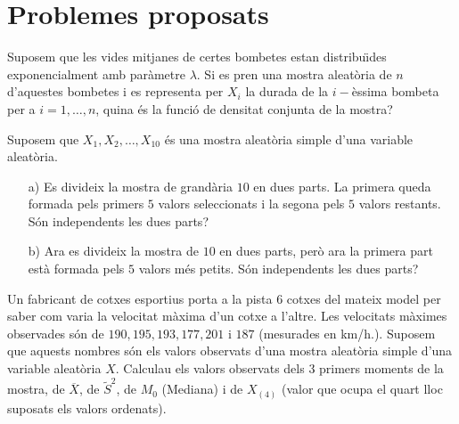 
\section{Problemes proposats}

\begin{prob}
{Suposem que les vides mitjanes de certes bombetes estan
distribu\"{\i}des exponencialment amb par\`ametre 
$\lambda$. Si es pren una mostra aleat\`oria 
de $n$ d'aquestes bombetes i es representa per $X_i$ la durada de
la $i-$\`essima bombeta per a $i=1,\ldots,n$, quina \'es la funci\'o 
de densitat conjunta de la mostra?}
\end{prob}

\begin{prob}
{Suposem que $X_1,X_2,\ldots,X_{10}$ \'es una mostra aleat\`oria simple
d'una variable aleat\`oria. 
\begin{itemize}
\item[a)] {Es divideix la mostra de grand\`aria $10$ en dues parts. 
La primera queda formada pels primers $5$ valors seleccionats i la segona 
pels $5$ valors restants. S\'on independents 
les dues parts?}
\item[b)] {Ara es divideix la mostra de $10$ en dues parts, 
per\`o ara la primera part est\`a formada pels $5$ valors m\'es petits. 
S\'on independents les dues parts?}
\end{itemize}}
\end{prob}

\begin{prob}
{Un fabricant de cotxes esportius porta a la pista $6$ 
cotxes del mateix model per saber com varia la velocitat 
m\`axima d'un cotxe a l'altre. Les velocitats 
m\`aximes observades s\'on de $190,195,193,177,201$ i $187$
(mesurades en km/h.). Suposem que aquests nombres s\'on els valors observats
d'una mostra aleat\`oria simple d'una variable aleat\`oria $X$. Calculau els
valors observats dels 3 primers moments de la mostra, 
de $\overline{X}$, de $\tilde{S}^2$, de $M_0$ (Mediana) i de 
$X_{(4)}$ (valor que ocupa el quart lloc
suposats els valors ordenats).}
\end{prob}

